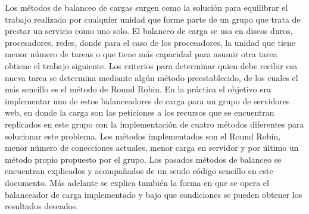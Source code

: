 Los métodos de balanceo de cargas surgen como la solución para equilibrar el trabajo realizado por cualquier unidad que forme parte de un grupo
que trata de prestar un servicio como uno solo. El balanceo de carga se usa en discos duros, procesadores, redes, donde para el caso de los
procesadores, la unidad que tiene menor número de tareas o que tiene más capacidad para asumir otra tarea obtiene el trabajo siguiente.
Los criterios para determinar quien debe recibir esa nueva tarea se determina mediante algún método preestablecido, de los cuales el más sencillo es
el método de Round Robin.
En la práctica el objetivo era implementar uno de estos balanceadores de carga para un grupo de servidores web, en donde la carga son las peticiones
a los recursos que se encuentran replicados en este grupo con la implementación de cuatro métodos diferentes para solucionar este problema. Los
métodos implementados son el Round Robin, menor número de conecciones actuales, menor carga en servidor y por último un método propio
propuesto por el grupo.
Los pasados métodos de balanceo se encuentran explicados y acompañados de un seudo código sencillo en este documento.
Más adelante se explica también la forma en que se opera el balanceador de carga implementado y bajo que condiciones se pueden obtener los
resultados deseados.
